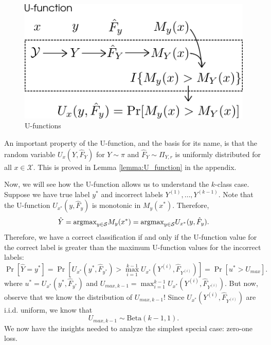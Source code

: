 \documentclass[12pt]{article}
\begin{document}
\begin{figure}[h]
\centering
\includegraphics[scale = 0.4]{extrapolation_figures/U_function.png}
\caption{U-functions}\label{fig:U_function}
\end{figure}

An important property of the U-function, and the basis for its name,
is that the random variable $U_x(Y, \hat{F}_Y)$ for $Y \sim \pi$ and
$\hat{F}_Y \sim \Pi_{Y, r}$ is uniformly distributed for all
$x \in \mathcal{X}$.  This is proved in Lemma \ref{lemma:U_function}
in the appendix.

Now, we will see how the U-function allows us to understand the
$k$-class case.  Suppose we have true label $y^*$ and incorrect labels
$Y^{(1)},\hdots, Y^{(k-1)}$.  Note that the U-function
$U_{x^*}(y, \hat{F}_y)$ is monotonic in $M_y(x^*)$.  Therefore,
\[
\hat{Y} = \text{argmax}_{y \in \mathcal{S}} M_y(x^*) = \text{argmax}_{y \in \mathcal{S}} U_{x^*}(y, \hat{F}_y).
\]
Therefore, we have a correct classification if and only if the U-function value for the correct label
is greater than the maximum U-function values for the incorrect labels:
\[
\Pr[\hat{Y} = y^*] = \Pr[U_{x^*}(y^*, \hat{F}_{y^*}) > \max_{i=1}^{k-1} U_{x^*}(Y^{(i)}, \hat{F}_{Y^{(i)}})] =  \Pr[u^* > U_{max}].
\]
where $u^* = U_{x^*}(y^*, \hat{F}_{y^*})$ and $U_{max, k-1}
= \max_{i=1}^{k-1} U_{x^*}(Y^{(i)}, \hat{F}_{Y^{(i)}})$.  But now,
observe that we know the distribution of $U_{max, k-1}$!  Since
$U_{x^*}(Y^{(i)}, \hat{F}_{Y^{(i)}})$ are i.i.d. uniform, we know that
\begin{equation}\label{eq:umax_beta}
U_{max, k-1} \sim \text{Beta}(k-1, 1). 
\end{equation}
We now have the insights needed to analyze the simplest special case: zero-one loss.
\newline
\end{document}
